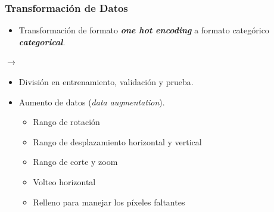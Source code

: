 \documentclass{beamer}
\begin{document}
\begin{frame}
  \frametitle{Transformación de Datos}

  \begin{itemize}
    \item Transformación de formato \textbf{\textit{one hot encoding}} a formato categórico \textbf{\textit{categorical}}.
  \end{itemize}

  $\rightarrow$

  \begin{itemize}
    \item <2-> División en entrenamiento, validación y prueba.
    \item <3-> Aumento de datos (\textit{data augmentation}).
    \begin{itemize}
      \item Rango de rotación
      \item Rango de desplazamiento horizontal y vertical
      \item Rango de corte y zoom
      \item Volteo horizontal
      \item Relleno para manejar los píxeles faltantes
    \end{itemize}
  \end{itemize}

\end{frame}
\end{document}
